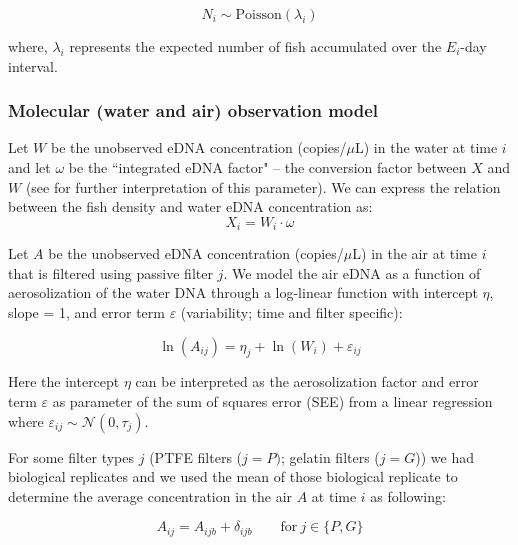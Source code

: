 \documentclass{article}
\begin{document}
\begin{equation}
N_i \sim \mathrm{Poisson}(\lambda_i)
\end{equation}

where, $\lambda_i$ represents the expected number of fish accumulated over the $E_i$-day interval.

\subsubsection{Molecular (water and air) observation model}
Let $W$ be the unobserved eDNA concentration (copies/$\mu$L) in the water at time $i$ and let $\omega$ be the ``integrated eDNA factor" -- the conversion factor between $X$ and $W$ (see \cite{guri2024a} for further interpretation of this parameter). We can express the relation between the fish density and water eDNA concentration as:
\begin{equation}
X_{i} = W_{i} \cdot \omega
\end{equation}

Let $A$ be the unobserved eDNA concentration (copies/$\mu$L) in the air at time $i$ that is filtered using passive filter $j$. We model the air eDNA as a function of aerosolization of the water DNA through a log-linear function with intercept $\eta$, slope = 1, and error term $\varepsilon$ (variability; time and filter specific):

\begin{equation}
\ln(A_{ij}) = \eta_{j} + \ln(W_{i}) + \varepsilon_{ij}
\end{equation}

Here the intercept $\eta$ can be interpreted as the aerosolization factor and error term $\varepsilon$ as parameter of the sum of squares error (SEE) from a linear regression where $\varepsilon_{ij} \sim \mathcal{N}(0,\tau_j)$.

For some filter types $j$ (PTFE filters (${j=P})$; gelatin filters (${j=G}$)) we had biological replicates and we used the mean of those biological replicate to determine the average concentration in the air $A$ at time $i$ as following:

\begin{equation}
A_{ij} = A_{ijb} + \delta_{ijb} \qquad \text{for} \ j \in \{P,G\}
\end{equation}

\end{document}
